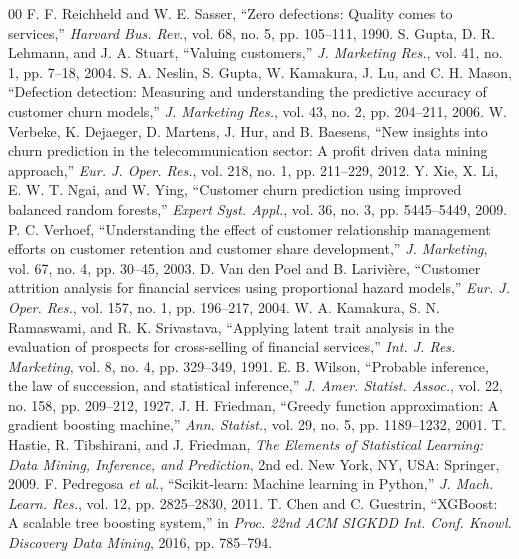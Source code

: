 \documentclass[10pt,twocolumn,letterpaper]{article}
\begin{document}
\balance
\begin{thebibliography}{00}\footnotesize
{} F. F. Reichheld and W. E. Sasser, ``Zero defections: Quality comes to services,'' \textit{Harvard Bus. Rev.}, vol. 68, no. 5, pp. 105--111, 1990.
 S. Gupta, D. R. Lehmann, and J. A. Stuart, ``Valuing customers,'' \textit{J. Marketing Res.}, vol. 41, no. 1, pp. 7--18, 2004.
 S. A. Neslin, S. Gupta, W. Kamakura, J. Lu, and C. H. Mason, ``Defection detection: Measuring and understanding the predictive accuracy of customer churn models,'' \textit{J. Marketing Res.}, vol. 43, no. 2, pp. 204--211, 2006.
 W. Verbeke, K. Dejaeger, D. Martens, J. Hur, and B. Baesens, ``New insights into churn prediction in the telecommunication sector: A profit driven data mining approach,'' \textit{Eur. J. Oper. Res.}, vol. 218, no. 1, pp. 211--229, 2012.
 Y. Xie, X. Li, E. W. T. Ngai, and W. Ying, ``Customer churn prediction using improved balanced random forests,'' \textit{Expert Syst. Appl.}, vol. 36, no. 3, pp. 5445--5449, 2009.
 P. C. Verhoef, ``Understanding the effect of customer relationship management efforts on customer retention and customer share development,'' \textit{J. Marketing}, vol. 67, no. 4, pp. 30--45, 2003.
 D. Van den Poel and B. Larivi\`ere, ``Customer attrition analysis for financial services using proportional hazard models,'' \textit{Eur. J. Oper. Res.}, vol. 157, no. 1, pp. 196--217, 2004.
 W. A. Kamakura, S. N. Ramaswami, and R. K. Srivastava, ``Applying latent trait analysis in the evaluation of prospects for cross-selling of financial services,'' \textit{Int. J. Res. Marketing}, vol. 8, no. 4, pp. 329--349, 1991.
 E. B. Wilson, ``Probable inference, the law of succession, and statistical inference,'' \textit{J. Amer. Statist. Assoc.}, vol. 22, no. 158, pp. 209--212, 1927.
 J. H. Friedman, ``Greedy function approximation: A gradient boosting machine,'' \textit{Ann. Statist.}, vol. 29, no. 5, pp. 1189--1232, 2001.
 T. Hastie, R. Tibshirani, and J. Friedman, \textit{The Elements of Statistical Learning: Data Mining, Inference, and Prediction}, 2nd ed. New York, NY, USA: Springer, 2009.
 F. Pedregosa \textit{et al.}, ``Scikit-learn: Machine learning in Python,'' \textit{J. Mach. Learn. Res.}, vol. 12, pp. 2825--2830, 2011.
 T. Chen and C. Guestrin, ``XGBoost: A scalable tree boosting system,'' in \textit{Proc. 22nd ACM SIGKDD Int. Conf. Knowl. Discovery Data Mining}, 2016, pp. 785--794.

\end{thebibliography}
\end{document}
